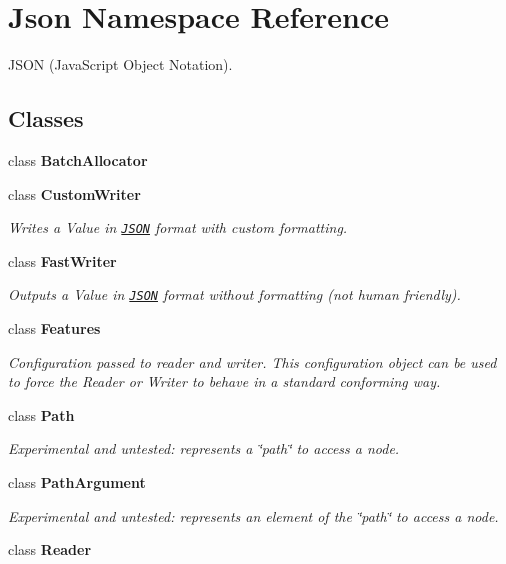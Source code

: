 \hypertarget{namespace_json}{\section{Json Namespace Reference}
\label{namespace_json}
}


J\+S\+O\+N (Java\+Script Object Notation).  


\subsection*{Classes}
\begin{DoxyCompactItemize}
\item 
class {\bfseries Batch\+Allocator}
\item 
class {\bfseries Custom\+Writer}
\begin{DoxyCompactList}\small\item\em Writes a Value in \href{http://www.json.org}{\tt J\+S\+O\+N} format with custom formatting. \end{DoxyCompactList}\item 
class {\bfseries Fast\+Writer}
\begin{DoxyCompactList}\small\item\em Outputs a Value in \href{http://www.json.org}{\tt J\+S\+O\+N} format without formatting (not human friendly). \end{DoxyCompactList}\item 
class {\bfseries Features}
\begin{DoxyCompactList}\small\item\em Configuration passed to reader and writer. This configuration object can be used to force the Reader or Writer to behave in a standard conforming way. \end{DoxyCompactList}\item 
class {\bfseries Path}
\begin{DoxyCompactList}\small\item\em Experimental and untested\+: represents a \char`\"{}path\char`\"{} to access a node. \end{DoxyCompactList}\item 
class {\bfseries Path\+Argument}
\begin{DoxyCompactList}\small\item\em Experimental and untested\+: represents an element of the \char`\"{}path\char`\"{} to access a node. \end{DoxyCompactList}\item 
class {\bfseries Reader}

\end{DoxyCompactItemize}

